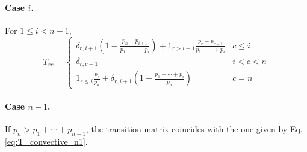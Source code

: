 \documentclass[12pt]{article}
\begin{document}
\paragraph{Case $i$.}
For $1 \le i < n - 1$,
$$
T_{rc}
=
\begin{cases}
  \delta_{r,i+1}\left(1 - \frac{ p_n - p_{i+1} } { p_1 + \cdots + p_i } \right)
  + 1_{r > i + 1} \frac{ p_r - p_{r - 1} } { p_1 + \cdots + p_i }
  & c \le i \\
  \delta_{r, c+1}
  & i < c < n \\
  1_{r \le i} \frac{ p_i } { p_n }
  +
  \delta_{r, i+1} \left( 1 - \frac{p_1 + \cdots + p_i } { p_n } \right)
  & c = n
\end{cases}
$$



\paragraph{Case $n - 1$.}

If $p_n > p_1 + \cdots + p_{n-1}$,
the transition matrix coincides
with the one given by Eq. \eqref{eq:T_convective_n1}.
\end{document}
